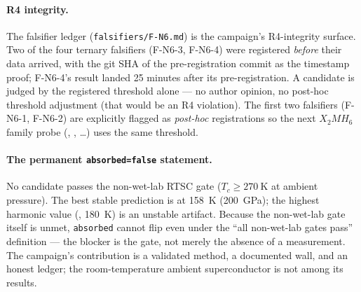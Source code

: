 \paragraph{R4 integrity.}
The falsifier ledger (\texttt{falsifiers/F-N6.md}) is the campaign's
R4-integrity surface. Two of the four ternary falsifiers (F-N6-3, F-N6-4)
were registered \emph{before} their data arrived, with the git SHA of the
pre-registration commit as the timestamp proof; F-N6-4's result landed 25
minutes after its pre-registration. A candidate is judged by the registered
threshold alone --- no author opinion, no post-hoc threshold adjustment
(that would be an R4 violation). The first two falsifiers (F-N6-1, F-N6-2)
are explicitly flagged as \emph{post-hoc} registrations so the next
$X_2MH_6$ family probe (, , \dots) uses the same
threshold.

\paragraph{The permanent \texttt{absorbed=false} statement.}
No candidate passes the non-wet-lab RTSC gate ($T_c \ge \SI{270}{\kelvin}$ at
ambient pressure). The best stable prediction is  at
\SI{158}{\kelvin} (\SI{200}{\giga\pascal}); the highest harmonic value
(, \SI{180}{\kelvin}) is an unstable artifact. Because the
non-wet-lab gate itself is unmet, \texttt{absorbed} cannot flip even under
the ``all non-wet-lab gates pass'' definition --- the blocker is the gate,
not merely the absence of a measurement. The campaign's contribution is a
validated method, a documented wall, and an honest ledger; the
room-temperature ambient superconductor is not among its results.
